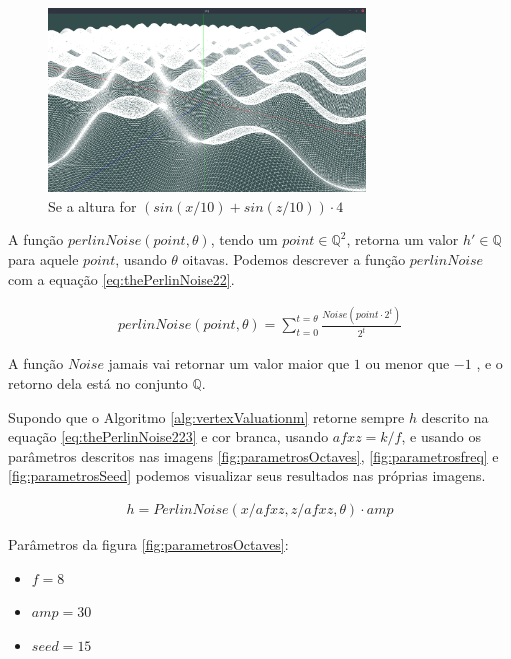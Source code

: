 \begin{figure}[H]
    \centering
    \includegraphics[width=0.75\textwidth]{figuras/sssins.png}
    \caption{Se a altura for $(sin(x/10) + sin(z/10)) \cdot 4$}
    \label{fig:sssins}
\end{figure}

A função $perlinNoise(point, \theta)$, tendo um $point \in \mathbb{Q}^{2}$,
retorna um valor $h' \in \mathbb{Q}$ para aquele $point$,
usando $\theta$ oitavas. Podemos descrever a função $perlinNoise$ com a equação \ref{eq:thePerlinNoise22}.

\begin{equation}\label{eq:thePerlinNoise22}
  \begin{split}
    perlinNoise(point, \theta) = \sum_{t=0}^{t=\theta} \frac{Noise(point \cdot 2^{t})}{2^{t}}
  \end{split}
\end{equation}

A função $Noise$ jamais vai retornar um valor maior que $1$ ou menor que $-1$ \cite{perlin1985image}, e o retorno dela
está no conjunto $\mathbb{Q}$.

Supondo que o Algoritmo \ref{alg:vertexValuationm} retorne sempre $h$ descrito na equação \ref{eq:thePerlinNoise223}
e cor branca, usando $afxz = k/f$, e usando os parâmetros descritos nas imagens \ref{fig:parametrosOctaves},
\ref{fig:parametrosfreq} e \ref{fig:parametrosSeed} podemos visualizar seus resultados nas próprias imagens.

\begin{equation}\label{eq:thePerlinNoise223}
  \begin{split}
    h = PerlinNoise(x/afxz, z/afxz, \theta) \cdot amp
  \end{split}
\end{equation}

Parâmetros da figura \ref{fig:parametrosOctaves}:
\begin{itemize}
    \item $f = 8$
    \item $amp = 30$
    \item $seed = 15$
\end{itemize}

